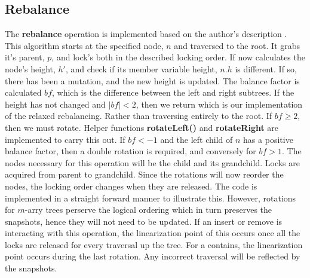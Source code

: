 \documentclass[conference]{IEEEtran}
\makeatletter
\theoremstyle{definition}
\theoremstyle{theorem}
\newenvironment{breakablealgorithm}
  {%
   \begin{center}
     \refstepcounter{algorithm}%
     \hrule height.8pt depth0pt \kern2pt%
     \renewcommand{\caption}[2][\relax]{%
       {\raggedright\textbf{\ALG@name~\thealgorithm} ##2\par}%
       \ifx\relax##1\relax %
         \addcontentsline{loa}{algorithm}{\protect\numberline{\thealgorithm}##2}%
       \else %
         \addcontentsline{loa}{algorithm}{\protect\numberline{\thealgorithm}##1}%
       \fi
       \kern2pt\hrule\kern2pt
     }
  }{%
     \kern2pt\hrule\relax%
   \end{center}
  }
\makeatother
\begin{document}
\subsection{Rebalance}
The \textbf{rebalance} operation is implemented based on the author's description \cite{pavt}. This algorithm starts at the specified node, $n$ and traversed to the root. It grabs it's parent, $p$, and lock's both in the described locking order. If now calculates the node's height, $h'$, and check if its member variable height, $n.h$ is different. If so, there has been a mutation, and the new height is updated. The balance factor is calculated $bf$, which is the difference between the left and right subtrees. If the height has not changed and $|bf|<2$, then we return which is our implementation of the relaxed rebalancing. Rather than traversing entirely to the root. If $bf\geq 2$, then we must rotate. Helper functions \textbf{rotateLeft()} and \textbf{rotateRight} are implemented to carry this out. If $bf<-1$ and the left child of $n$ has a positive balance factor, then a double rotation is required, and conversely for $bf>1$. The nodes necessary for this operation will be the child and its grandchild. Locks are acquired from parent to grandchild. Since the rotations will now reorder the nodes, the locking order changes when they are released. The code is implemented in a straight forward manner to illustrate this. However, rotations for $m$-arry trees perserve the logical ordering which in turn preserves the snapshots, hence they will not need to be updated. If an insert or remove is interacting with this operation, the linearization point of this occurs once all the locks are released for every traversal up the tree. For a contains, the linearization point occurs during the last rotation. Any incorrect traversal will be reflected by the snapshots.
%
\end{document}
